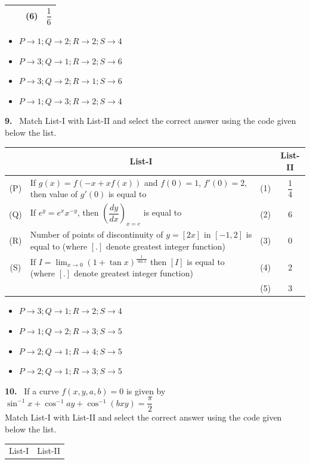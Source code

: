 \documentclass[10pt]{extarticle}
\newcommand{\qn}[1]{\par\smallskip\noindent\textbf{#1.}~}
\newenvironment{qoptions}{\begin{itemize}[leftmargin=1.8em,itemsep=1pt,topsep=2pt,label={}]}{\end{itemize}}
\newcommand{\opt}[2]{\item[(#1)] #2}
\begin{document}
\begin{multicols}{2}
\begin{center}
\begin{tabular}{|c|l|c|c|}
 & & (6) & $\dfrac16$\\[3pt]
\hline
\end{tabular}
\end{center}
\begin{qoptions}
\opt{A}{$P\to1;Q\to2;R\to2;S\to4$}
\opt{B}{$P\to3;Q\to1;R\to2;S\to6$}
\opt{C}{$P\to3;Q\to2;R\to1;S\to6$}
\opt{D}{$P\to1;Q\to3;R\to2;S\to4$}
\end{qoptions}
\qn{9} Match List-I with List-II and select the correct answer using the code given below the list.
\begin{center}\footnotesize\renewcommand{\arraystretch}{1.1}\setlength{\extrarowheight}{3.5pt}\setlength{\tabcolsep}{2pt}
\begin{tabular}{|c|l|c|c|}
\hline
 & \multicolumn{1}{c|}{List-I} & & List-II\\[3pt]
\hline
(P) & \parbox[t]{4.4cm}{If $g(x)=f(-x+xf(x))$ and $f(0)=1$, $f'(0)=2$, then value of $g'(0)$ is equal to} & (1) & $\dfrac14$\\[10pt]
(Q) & \parbox[t]{4.4cm}{If $e^y=e^xx^{-y}$, then $\left(\dfrac{dy}{dx}\right)_{x=e}$ is equal to} & (2) & 6\\[8pt]
(R) & \parbox[t]{4.4cm}{Number of points of discontinuity of $y=[2x]$ in $[-1,2]$ is equal to (where $[.]$ denote greatest integer function)} & (3) & 0\\[10pt]
(S) & \parbox[t]{4.4cm}{If $I=\displaystyle\lim_{x\to0}(1+\tan x)^{\frac1{\sin x}}$ then $[I]$ is equal to (where $[.]$ denote greatest integer function)} & (4) & 2\\[10pt]
 & & (5) & 3\\[3pt]
\hline
\end{tabular}
\end{center}
\begin{qoptions}
\opt{A}{$P\to3;Q\to1;R\to2;S\to4$}
\opt{B}{$P\to1;Q\to2;R\to3;S\to5$}
\opt{C}{$P\to2;Q\to1;R\to4;S\to5$}
\opt{D}{$P\to2;Q\to1;R\to3;S\to5$}
\end{qoptions}
\qn{10} If a curve $f(x,y,a,b)=0$ is given by $\sin^{-1}x+\cos^{-1}ay+\cos^{-1}(bxy)=\dfrac\pi2$\\
Match List-I with List-II and select the correct answer using the code given below the list.
\begin{center}\footnotesize\renewcommand{\arraystretch}{1.1}\setlength{\extrarowheight}{3.5pt}\setlength{\tabcolsep}{2pt}
\begin{tabular}{|c|l|c|l|}
\hline
\multicolumn{2}{|c|}{List-I} & \multicolumn{2}{c|}{List-II}\\[3pt]

\end{tabular}
\end{center}
\end{multicols}
\end{document}
